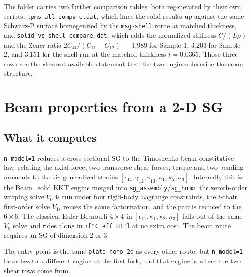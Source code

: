 The folder carries two further comparison tables, both regenerated by their own
scripts: \texttt{tpms\_all\_compare.dat}, which lines the solid results up
against the same Schwarz-P surface homogenized by the \texttt{msg-shell} route
at matched thickness, and \texttt{solid\_vs\_shell\_compare.dat}, which adds the
normalized stiffness $C/(E\rho)$ and the Zener ratio $2C_{44}/(C_{11}-C_{12})$
--- 1.989 for Sample 1, 3.203 for Sample 2, and 3.151 for the shell run at the
matched thickness $t = 0.0365$. Those three rows are the cleanest available
statement that the two engines describe the same structure.

\section{Beam properties from a 2-D SG}
\label{sec:solid-beam}

\subsection{What it computes}

\texttt{n\_model=1} reduces a cross-sectional SG to the Timoshenko beam
constitutive law, relating the axial force, two transverse shear forces, torque
and two bending moments to the six generalized strains
$[\epsilon_{11},\gamma_{12},\gamma_{13},\kappa_1,\kappa_2,\kappa_3]$. Internally
this is the Beam\_solid KKT engine merged into
\texttt{sg\_assembly}/\texttt{sg\_homo}: the zeroth-order warping solve $V_0$ is
run under four rigid-body Lagrange constraints, the $l$-chain first-order solve
$V_{1s}$ reuses the same factorization, and the pair is reduced to the
$6\times6$. The classical Euler-Bernoulli $4\times4$ in
$[\epsilon_{11},\kappa_1,\kappa_2,\kappa_3]$ falls out of the same $V_0$ solve
and rides along in \texttt{r["C\_eff\_EB"]} at no extra cost. The beam route
requires an SG of dimension 2 or 3.

The entry point is the same \texttt{plate\_homo\_2d} as every other route, but
\texttt{n\_model=1} branches to a different engine at the first fork, and that
engine is where the two shear rows come from.

